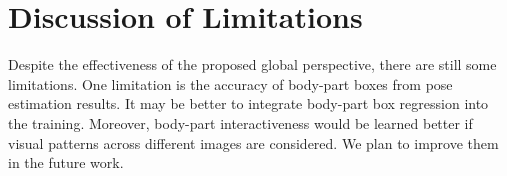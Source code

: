 \documentclass[runningheads]{llncs}
\begin{document}
\section{Discussion of Limitations}
Despite the effectiveness of the proposed global perspective, there are still some limitations.
One limitation is the accuracy of body-part boxes from pose estimation results. It may be better to integrate
body-part box regression into the training. Moreover, body-part interactiveness would be learned better if visual patterns across different images are considered.
We plan to improve them in the future work.

\clearpage


\end{document}
